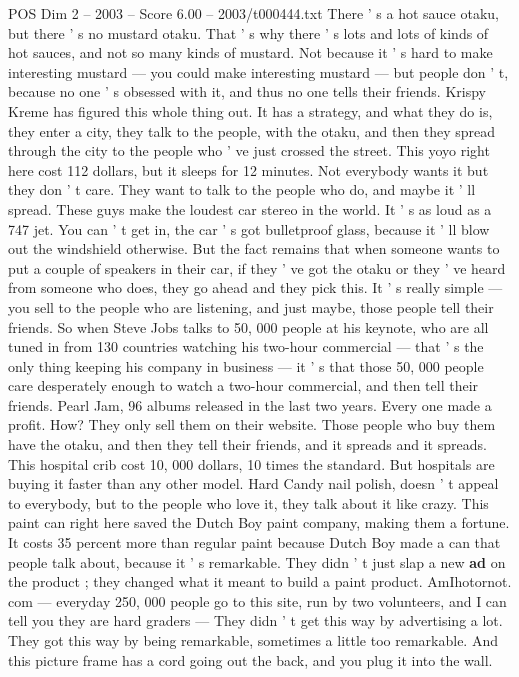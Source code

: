 \begin{textsample}{POS Dim 2 – 2003 – Score 6.00 – 2003/t000444.txt}
There ' s a hot sauce otaku, but there ' s no mustard otaku.
That ' s why there ' s lots and lots of kinds of hot sauces, and not so many kinds of mustard.
Not because it ' s hard to make interesting mustard — you could make interesting mustard — but people don ' t, because no one ' s obsessed with it, and thus no one tells their friends.
Krispy Kreme has figured this whole thing out.
It has a strategy, and what they do is, they enter a city, they talk to the people, with the otaku, and then they spread through the city to the people who ' ve just crossed the street.
This yoyo right here cost 112 dollars, but it sleeps for 12 minutes.
Not everybody wants it but they don ' t care.
They want to talk to the people who do, and maybe it ' ll spread.
These guys make the loudest car stereo in the world.
It ' s as loud as a 747 jet.
You can ' t get in, the car ' s got bulletproof glass, because it ' ll blow out the windshield otherwise.
But the fact remains that when someone wants to put a couple of speakers in their car, if they ' ve got the otaku or they ' ve heard from someone who does, they go ahead and they pick this.
It ' s really simple — you sell to the people who are listening, and just maybe, those people tell their friends.
So when Steve Jobs talks to 50, 000 people at his keynote, who are all tuned in from 130 countries watching his two-hour commercial — that ' s the only thing keeping his company in business — it ' s that those 50, 000 people care desperately enough to watch a two-hour commercial, and then tell their friends.
Pearl Jam, 96 albums released in the last two years.
Every one made a profit.
How?
They only sell them on their website.
Those people who buy them have the otaku, and then they tell their friends, and it spreads and it spreads.
This hospital crib cost 10, 000 dollars, 10 times the standard.
But hospitals are buying it faster than any other model.
Hard Candy nail polish, doesn ' t appeal to everybody, but to the people who love it, they talk about it like crazy.
This paint can right here saved the Dutch Boy paint company, making them a fortune.
It costs 35 percent more than regular paint because Dutch Boy made a can that people talk about, because it ' s remarkable.
They didn ' t just slap a new \textbf{ad} on the product ; they changed what it meant to build a paint product.
AmIhotornot. com — everyday 250, 000 people go to this site, run by two volunteers, and I can tell you they are hard graders — They didn ' t get this way by advertising a lot.
They got this way by being remarkable, sometimes a little too remarkable.
And this picture frame has a cord going out the back, and you plug it into the wall.

\end{textsample}
